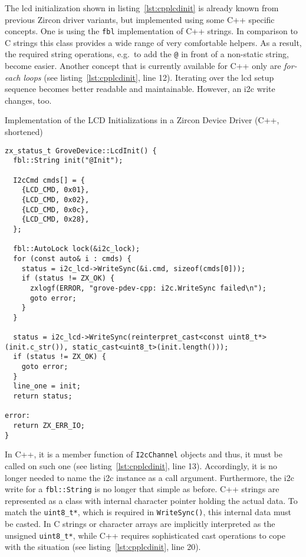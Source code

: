 The \ac{lcd} initialization shown in listing~\ref{lst:cpplcdinit} is already known from previous Zircon driver variants, but implemented using some C++ specific concepts.
One is using the \texttt{fbl} implementation of C++ strings.
In comparison to C strings this class provides a wide range of very comfortable helpers.
As a result, the required string operations, e.g.\ to add the \texttt{@} in front of a non-static string, become easier.
Another concept that is currently available for C++ only are \textit{for-each loops} (see listing~\ref{lst:cpplcdinit}, line 12).
Iterating over the \ac{lcd} setup sequence becomes better readable and maintainable.
However, an \ac{i2c} write changes, too.
%
\begin{listing} [H]
    \caption{Implementation of the LCD Initializations in a Zircon Device Driver (C++, shortened)}
\label{lst:cpplcdinit}
\begin{verbatim}
zx_status_t GroveDevice::LcdInit() {
  fbl::String init("@Init");

  I2cCmd cmds[] = {
    {LCD_CMD, 0x01},
    {LCD_CMD, 0x02},
    {LCD_CMD, 0x0c},
    {LCD_CMD, 0x28},
  };

  fbl::AutoLock lock(&i2c_lock);
  for (const auto& i : cmds) {
    status = i2c_lcd->WriteSync(&i.cmd, sizeof(cmds[0]));
    if (status != ZX_OK) {
      zxlogf(ERROR, "grove-pdev-cpp: i2c.WriteSync failed\n");
      goto error;
    }
  }

  status = i2c_lcd->WriteSync(reinterpret_cast<const uint8_t*>(init.c_str()), static_cast<uint8_t>(init.length()));
  if (status != ZX_OK) {
    goto error;
  }
  line_one = init;
  return status;

error:
  return ZX_ERR_IO;
}
\end{verbatim}
\end{listing}
%
In C++, it is a member function of \texttt{I2cChannel} objects and thus, it must be called on such one (see listing~\ref{lst:cpplcdinit}, line 13).
Accordingly, it is no longer needed to name the \ac{i2c} instance as a call argument.
Furthermore, the \ac{i2c} write for a \texttt{fbl::String} is no longer that simple as before.
C++ strings are represented as a class with internal character pointer holding the actual data.
To match the \texttt{uint8_t*}, which is required in \texttt{WriteSync()}, this internal data must be casted.
In C strings or character arrays are implicitly interpreted as the unsigned \texttt{uint8_t*}, while C++ requires sophisticated cast operations to cope with the situation (see listing~\ref{lst:cpplcdinit}, line 20).
